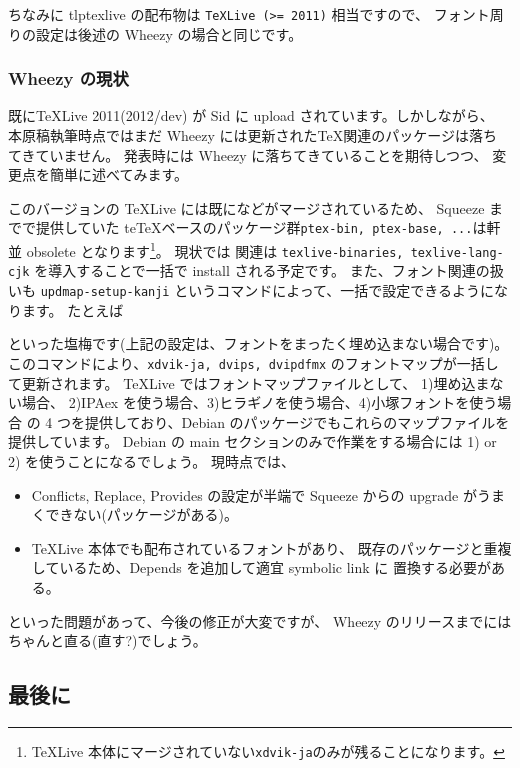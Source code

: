 \documentclass[mingoth,a4paper]{jsarticle}
\begin{document}
ちなみに tlptexlive の配布物は {\tt{{\TeX}Live (>= 2011)}} 相当ですので、
フォント周りの設定は後述の Wheezy の場合と同じです。

\subsubsection{Wheezy の現状}

既に{\TeX}Live 2011(2012/dev) が Sid に upload されています。しかしながら、
本原稿執筆時点ではまだ Wheezy には更新された{\TeX}関連のパッケージは落ち
てきていません。
発表時には Wheezy に落ちてきていることを期待しつつ、
変更点を簡単に述べてみます。

このバージョンの {\TeX}Live には既に\pTeX などがマージされているため、
Squeeze までで提供していた te\TeX ベースのパッケージ群{\tt{ptex-bin, ptex-base, ...}}は軒並 obsolete となります\footnote{%
  {\TeX}Live 本体にマージされていない{\tt{xdvik-ja}}のみが残ることになります。
}。
%
現状では \pTeX 関連は {\tt{texlive-binaries, texlive-lang-cjk}} を導入することで一括で install される予定です。
また、フォント関連の扱いも {\tt{updmap-setup-kanji}} というコマンドによって、一括で設定できるようになります。
%
たとえば
\noindent といった塩梅です(上記の設定は、フォントをまったく埋め込まない場合です)。
このコマンドにより、{\tt{xdvik-ja, dvips, dvipdfmx}} のフォントマップが一括して更新されます。
%
{\TeX}Live ではフォントマップファイルとして、
1)埋め込まない場合、 2)IPAex を使う場合、3)ヒラギノを使う場合、4)小塚フォントを使う場合
の 4 つを提供しており、Debian のパッケージでもこれらのマップファイルを提供しています。
Debian の main セクションのみで作業をする場合には 1) or 2) を使うことになるでしょう。
現時点では、
\begin{itemize}
\item Conflicts, Replace, Provides の設定が半端で
  Squeeze からの upgrade がうまくできない(パッケージがある)。
\item {\TeX}Live 本体でも配布されているフォントがあり、
  既存のパッケージと重複しているため、Depends を追加して適宜 symbolic link に
  置換する必要がある。
\end{itemize}
といった問題があって、今後の修正が大変ですが、
Wheezy のリリースまでにはちゃんと直る(直す?)でしょう。

\subsection{最後に}
\end{document}
